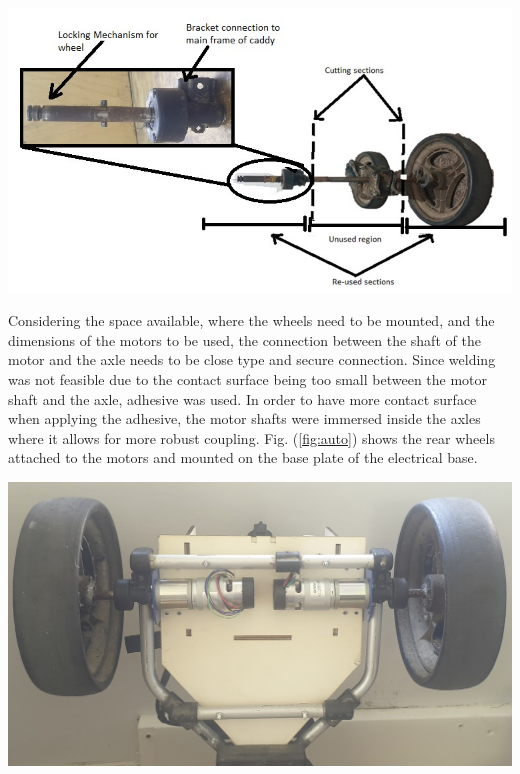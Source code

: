 \documentclass[11pt,landscape]{article}
\newenvironment{Figure}
  {\par\medskip\noindent\minipage{\linewidth}}
  {\endminipage\par\medskip}
\begin{document}
\begin{multicols}{2}
\begin{Figure}
    \begin{center}
        \includegraphics[width=\textwidth]{Figure26.jpg}
        \label{fig:rear}
    \end{center}
\end{Figure}

Considering the space available, where the wheels need to be mounted, and
the dimensions of the motors to be used, the connection between the shaft of
the motor and the axle needs to be close type and secure connection. Since
welding was not feasible due to the contact surface being too small between
the motor shaft and the axle, adhesive was used. In order to have more
contact surface when applying the adhesive, the motor shafts were immersed
inside the axles where it allows for more robust coupling. Fig.
(\ref{fig:auto}) shows the rear wheels attached to the motors and mounted on
the base plate of the electrical base.

\begin{Figure}
    \begin{center}
        \includegraphics[width=\textwidth]{Figure27.jpg}
        \label{fig:auto}
    \end{center}
\end{Figure}



\end{multicols}
\end{document}
